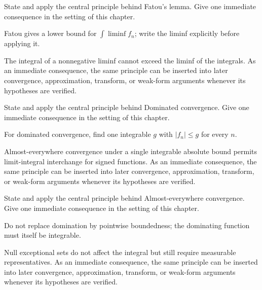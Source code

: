 \begin{exercise}\label{exr:iii04-02}
State and apply the central principle behind Fatou's lemma. Give one immediate consequence in the setting of this chapter.
\end{exercise}
\begin{hint}
Fatou gives a lower bound for \(\int\liminf f_n\); write the liminf explicitly before applying it.
\end{hint}
\begin{solution}
The integral of a nonnegative liminf cannot exceed the liminf of the integrals. As an immediate consequence, the same principle can be inserted into later convergence, approximation, transform, or weak-form arguments whenever its hypotheses are verified.
\end{solution}

\begin{exercise}\label{exr:iii04-03}
State and apply the central principle behind Dominated convergence. Give one immediate consequence in the setting of this chapter.
\end{exercise}
\begin{hint}
For dominated convergence, find one integrable \(g\) with \(|f_n|\le g\) for every \(n\).
\end{hint}
\begin{solution}
Almost-everywhere convergence under a single integrable absolute bound permits limit-integral interchange for signed functions. As an immediate consequence, the same principle can be inserted into later convergence, approximation, transform, or weak-form arguments whenever its hypotheses are verified.
\end{solution}

\begin{exercise}\label{exr:iii04-04}
State and apply the central principle behind Almost-everywhere convergence. Give one immediate consequence in the setting of this chapter.
\end{exercise}
\begin{hint}
Do not replace domination by pointwise boundedness; the dominating function must itself be integrable.
\end{hint}
\begin{solution}
Null exceptional sets do not affect the integral but still require measurable representatives. As an immediate consequence, the same principle can be inserted into later convergence, approximation, transform, or weak-form arguments whenever its hypotheses are verified.
\end{solution}

